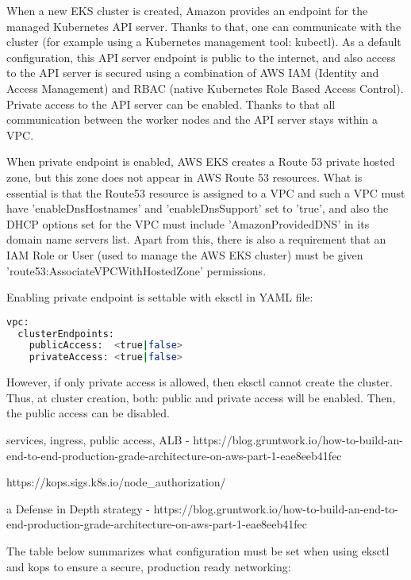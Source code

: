 When a new EKS cluster is created, Amazon provides an endpoint for the managed Kubernetes API server. Thanks to that, one can communicate with the cluster (for example using a Kubernetes management tool: kubectl). As a default configuration, this API server endpoint is public to the internet, and also access to the API server is secured using a combination of AWS IAM (Identity and Access Management) and RBAC (native Kubernetes Role Based Access Control). Private access to the API server can be enabled. Thanks to that all communication between the worker nodes and the API server stays within a VPC\cite{eks-cluster-endpoint}.

When private endpoint is enabled, AWS EKS creates a Route 53 private hosted zone, but this zone does not appear in AWS Route 53 resources. What is essential is that the Route53 resource is assigned to a VPC and such a VPC must have 'enableDnsHostnames' and 'enableDnsSupport' set to 'true', and also the DHCP options set for the VPC must include 'AmazonProvidedDNS' in its domain name servers list. Apart from this, there is also a requirement that an IAM Role or User (used to manage the AWS EKS cluster) must be given 'route53:AssociateVPCWithHostedZone' permissions\cite{eks-cluster-endpoint}.

Enabling private endpoint is settable with eksctl in YAML file\cite{eksctl-net}:
\begin{lstlisting}[basicstyle=\small,caption={YAML configuration used by eksctl to set EKS cluster endpoints},captionpos=b,language=Bash,xleftmargin=1cm]
vpc:
  clusterEndpoints:
    publicAccess:  <true|false>
    privateAccess: <true|false>
\end{lstlisting}
However, if only private access is allowed, then eksctl cannot create the cluster. Thus, at cluster creation, both: public and private access will be enabled. Then, the public access can be disabled\cite{eksctl-net}.


services, ingress, public access, ALB - https://blog.gruntwork.io/how-to-build-an-end-to-end-production-grade-architecture-on-aws-part-1-eae8eeb41fec

https://kops.sigs.k8s.io/node_authorization/

a Defense in Depth strategy - https://blog.gruntwork.io/how-to-build-an-end-to-end-production-grade-architecture-on-aws-part-1-eae8eeb41fec

The table below summarizes what configuration must be set when using eksctl and kops to ensure a secure, production ready networking:

